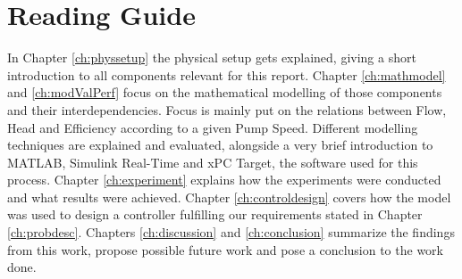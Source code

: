 \section*{Reading Guide}
In Chapter \ref{ch:physsetup} the physical setup gets explained,
giving a short introduction to all components relevant for this report.
Chapter \ref{ch:mathmodel} and \ref{ch:modValPerf}
focus on the mathematical modelling of those components and their interdependencies.
Focus is mainly put on the relations between Flow, Head and Efficiency according to a given Pump Speed.
Different modelling techniques are explained and evaluated,
alongside a very brief introduction to MATLAB\textsuperscript{\textregistered{}},
Simulink\textsuperscript{\textregistered{}} Real-Time\texttrademark{} and xPC Target,
the software used for this process.
Chapter \ref{ch:experiment} explains how the experiments were conducted
and what results were achieved.
Chapter \ref{ch:controldesign} covers how the model was used to design a controller
fulfilling our requirements stated in Chapter \ref{ch:probdesc}.
Chapters \ref{ch:discussion} and \ref{ch:conclusion} summarize the findings from this work,
propose possible future work and pose a conclusion to the work done.
